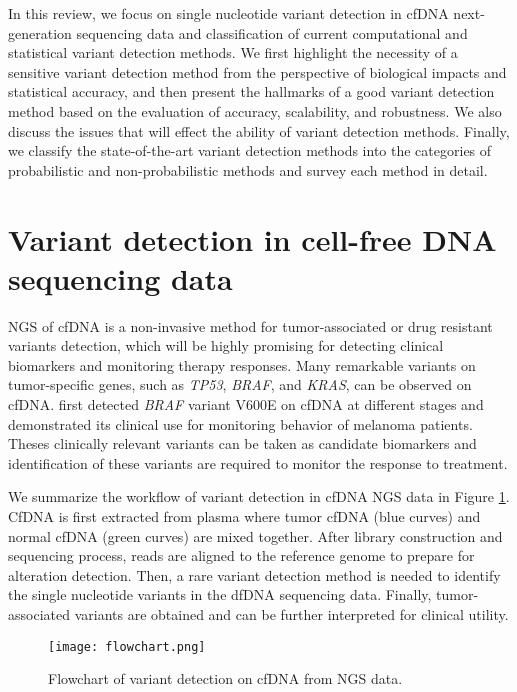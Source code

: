 \documentclass[11pt,reqno]{amsart}
\begin{document}
In this review, we focus on single nucleotide variant detection in cfDNA next-generation sequencing data and classification of current computational and statistical variant detection methods.
We first highlight the necessity of a sensitive variant detection method from the perspective of biological impacts and statistical accuracy,
and then present the hallmarks of a good variant detection method based on the evaluation of accuracy, scalability, and robustness.
We also discuss the issues that will effect the ability of variant detection methods.
Finally, we classify the state-of-the-art variant detection methods into the categories of probabilistic and non-probabilistic methods and survey each method in detail.


\section{Variant detection in cell-free DNA sequencing data}

NGS of cfDNA is a non-invasive method for tumor-associated or drug resistant variants detection, which will be highly promising for detecting clinical biomarkers and monitoring therapy responses. 
Many remarkable variants on tumor-specific genes, such as \textit{TP53}, \textit{BRAF}, and \textit{KRAS}, can be observed on cfDNA.
\citet{shinozaki2007utility} first detected \textit{BRAF} variant V600E on cfDNA at different stages and demonstrated its clinical use for monitoring behavior of melanoma patients.
Theses clinically relevant variants can be taken as candidate biomarkers and identification of these variants are required to monitor the response to treatment.

We summarize the workflow of variant detection in cfDNA NGS data in Figure \ref{fig:flowchart}.
CfDNA is first extracted from plasma where tumor cfDNA (blue curves) and normal cfDNA (green curves) are mixed together.
After library construction and sequencing process, reads are aligned to the reference genome to prepare for alteration detection.
Then, a rare variant detection method is needed to identify the single nucleotide variants in the dfDNA sequencing data.
Finally, tumor-associated variants are obtained and can be further interpreted for clinical utility.


\begin{figure}[htbp]
\centering
\texttt{[image: flowchart.png]}
\caption{Flowchart of variant detection on cfDNA from NGS data.}
\label{fig:flowchart}
\end{figure}
\end{document}
